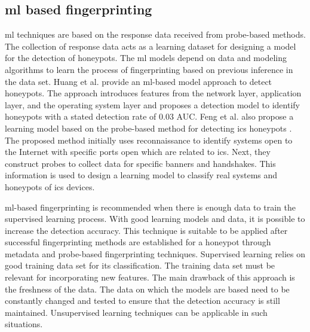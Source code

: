 \subsection{\acrfull{ml} based fingerprinting}
\acrfull{ml} techniques are based on the response data received from probe-based methods. The collection of response data acts as a learning dataset for designing a model for the detection of honeypots. The \acrshort{ml} models depend on data and modeling algorithms to learn the process of fingerprinting based on previous inference in the data set. Huang et al.  provide an \acrshort{ml}-based model approach to detect honeypots\cite{huang}. The approach introduces features from the network layer, application layer, and the operating system layer and proposes a detection model to identify honeypots with a stated detection rate of 0.03 AUC. Feng et al.  also propose a learning model based on the probe-based method for detecting \acrshort{ics} honeypots \cite{Feng2016}. The proposed method initially uses reconnaissance to identify systems open to the Internet with specific ports open which are related to \acrshort{ics}. Next, they construct probes to collect data for specific banners and handshakes. This information is used to design a learning model to classify real systems and honeypots of \acrshort{ics} devices.

\acrshort{ml}-based fingerprinting is recommended when there is enough data to train the supervised learning process. With good learning models and data, it is possible to increase the detection accuracy. This technique is suitable to be applied after successful fingerprinting methods are established for a honeypot through metadata and probe-based fingerprinting techniques. Supervised learning relies on good training data set for its classification. The training data set must be relevant for incorporating new features. The main drawback of this approach is the freshness of the data. The data on which the models are based need to be constantly changed and tested to ensure that the detection accuracy is still maintained. Unsupervised learning techniques can be applicable in such situations. 
